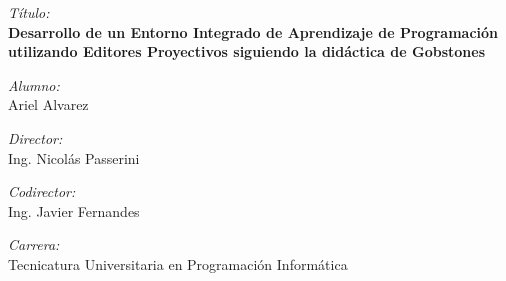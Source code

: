 \Large \emph{Título:}\\
\textbf{Desarrollo de un Entorno Integrado de Aprendizaje de Programación utilizando Editores Proyectivos siguiendo la didáctica de Gobstones}
\bigskip

\Large \emph{Alumno:}\\
Ariel Alvarez
\bigskip

\Large \emph{Director:}\\
Ing. Nicolás Passerini
\bigskip

\Large \emph{Codirector:}\\
Ing. Javier Fernandes
\bigskip


\Large \emph{Carrera:}\\
Tecnicatura Universitaria en Programación Informática
